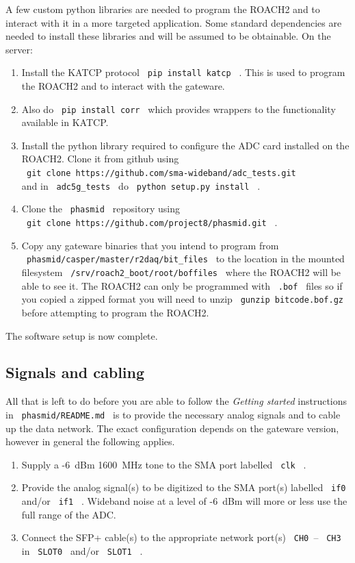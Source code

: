 \documentclass[a4paper,10pt]{article}
\newcommand{\ilcode}[1]{\begingroup
	\setlength{\fboxsep}{1pt}\colorbox{ilcodebg}{\small\tt%
		#1%
	}\endgroup}
\begin{document}
A few custom python libraries are needed to program the ROACH2 and to 
interact with it in a more targeted application. Some standard 
dependencies are needed to install these libraries and will be assumed 
to be obtainable. On the server:
\begin{enumerate}
	\item Install the KATCP protocol \ilcode{pip install katcp} . This
	is used to program the ROACH2 and to interact with the gateware. 
	\item Also do \ilcode{pip install corr} which provides wrappers to
	the functionality available in KATCP.
	\item Install the python library required to configure the ADC card 
	installed on the ROACH2. Clone it from github using\\
	\ilcode{git clone https://github.com/sma-wideband/adc\_tests.git}\\
	and in \ilcode{adc5g\_tests} do \ilcode{python setup.py install} .
	\item Clone the \ilcode{phasmid} repository using\\
	\ilcode{git clone https://github.com/project8/phasmid.git} . 
	\item Copy any gateware binaries that you intend to program from\\
	\ilcode{phasmid/casper/master/r2daq/bit\_files} to the location in the 
	mounted filesystem \ilcode{/srv/roach2\_boot/root/boffiles} 
	where the ROACH2 will be able to see it. The ROACH2 can only be 
	programmed with \ilcode{.bof} files so if you copied a zipped format 
	you will need to unzip \ilcode{gunzip bitcode.bof.gz} before 
	attempting to program the ROACH2.
\end{enumerate}

\noindent The software setup is now complete.
\subsection{Signals and cabling}
\label{sec:snc}
All that is left to do before you are able to follow the {\em Getting 
started} instructions in \ilcode{phasmid/README.md} is to provide the 
necessary analog signals and to cable up the data network. The exact 
configuration depends on the gateware version, however in general the 
following applies.
\begin{enumerate}
	\item Supply a -6~dBm 1600~MHz tone to the SMA port labelled 
	\ilcode{clk} .
	\item Provide the analog signal(s) to be digitized to the SMA port(s) 
	labelled \ilcode{if0} and/or \ilcode{if1} .
	Wideband noise at a level of -6~dBm will more or less use the full 
	range of the ADC.
	\item Connect the SFP+ cable(s) to the appropriate network port(s)
	\ilcode{CH0}--\ilcode{CH3} in \ilcode{SLOT0} and/or \ilcode{SLOT1} .
\end{enumerate}
\end{document}
